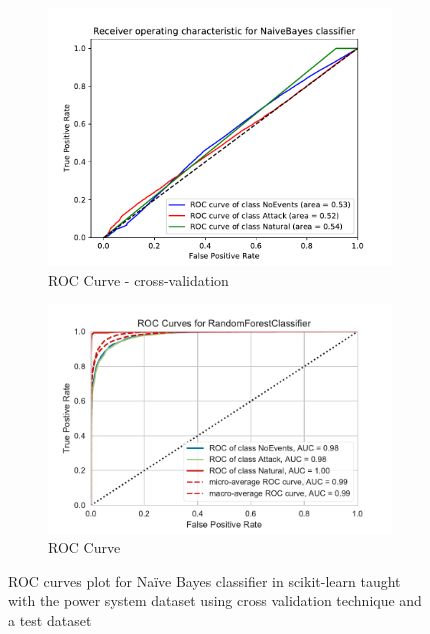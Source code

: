 \begin{figure}[t]
    \centering
    \begin{subfigure}[t]{110mm}
        \centering
        \includegraphics[page=1, width=\linewidth]{images/results_scikit/NaiveBayes}
        \caption{ROC Curve - cross-validation}
        \label{fig:scikit_NB_ROC}
    \end{subfigure}
    \begin{subfigure}[t]{110mm}
        \centering
        \includegraphics[page=4, width=\linewidth]{images/roc_3c}
        \caption{ROC Curve}
        \label{fig:scikit_RF_ROC}
    \end{subfigure}
    \caption{ROC curves plot for Naïve Bayes classifier in scikit-learn taught with the power system dataset using cross validation technique and a test dataset}
    \label{fig:ROCCM_NB}
\end{figure}


